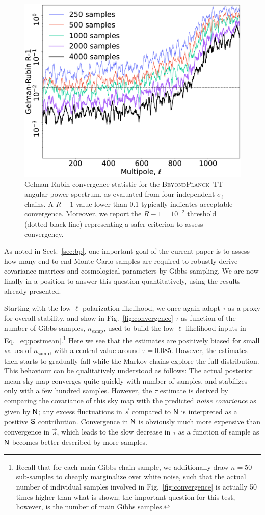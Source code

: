 \documentclass[onecolumn]{aa}
\newcommand{\s}[0]{\vec{s}}
\newcommand{\N}[0]{\tens{N}}
\renewcommand{\S}[0]{\tens{S}}
\newcommand{\BP}{\textsc{BeyondPlanck}}
\begin{document}
\begin{figure}[t]
  \center
  \includegraphics[width=0.7\linewidth]{figs/sigmal_GR.pdf}
  \caption{Gelman-Rubin convergence statistic for the \BP\ $\mathrm{TT}$
    angular power spectrum, as evaluated from four independent
    $\sigma_{\ell}$ chains. A $R-1$ value lower than 0.1 
    typically indicates
    acceptable convergence. Moreover, we report the $R-1=10^{-2}$ 
    threshold (dotted black line)
    representing a safer criterion to assess convergency.}
    \label{fig:gr_TT}
\end{figure}

As noted in Sect.~\ref{sec:bp}, one important goal of the current
paper is to assess how many end-to-end Monte Carlo samples are
required to robustly derive covariance matrices and cosmological
parameters by Gibbs sampling. We are now finally in a position to
answer this question quantitatively, using the results already
presented.

Starting with the low-$\ell$ polarization likelihood, we once again
adopt $\tau$ as a proxy for overall stability, and show in
Fig.~\ref{fig:convergence} $\tau$ as function of the number of Gibbs
samples, $n_{\mathrm{samp}}$, used to build the low-$\ell$ likelihood
inputs in Eq.~\ref{eq:postmean}.\footnote{Recall that for each main
  Gibbs chain sample, we additionally draw $n=50$ sub-samples to
  cheaply marginalize over white noise, such that the actual number of
  individual samples involved in Fig.~\ref{fig:convergence} is
  actually 50 times higher than what is shown; the important question
  for this test, however, is the number of main Gibbs samples.} Here
we see that the estimates are positively biased for small values of
$n_{\mathrm{samp}}$, with a central value around
$\tau=0.085$. However, the estimates then starts to gradually fall
while the Markov chains explore the full distribution. This behaviour
can be qualitatively understood as follows: The actual posterior mean
sky map converges quite quickly with number of samples, and stabilizes
only with a few hundred samples. However, the $\tau$ estimate is
derived by comparing the covariance of this sky map with the predicted
\emph{noise covariance} as given by $\N$; any excess fluctuations in
$\bar{\s}$ compared to $\N$ is interpreted as a positive $\S$
contribution. Convergence in $\N$ is obviously much more expensive 
than convergence in $\bar{\s}$, which leads to the slow decrease in 
$\tau$ as a function of sample as $\N$ becomes better 
described by more samples.
\end{document}
